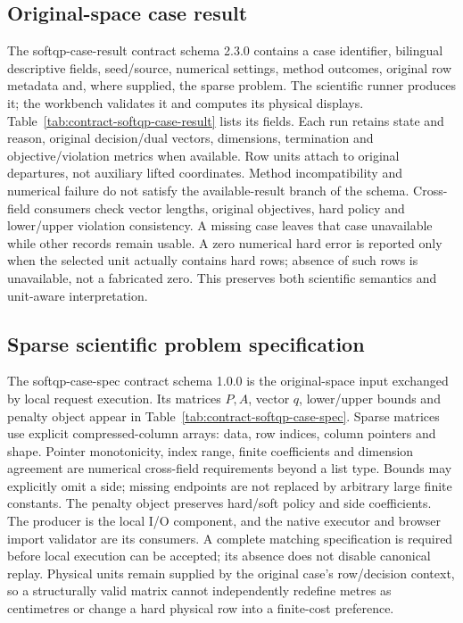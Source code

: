 \subsection{Original-space case result}\label{sec:contract-softqp-case-result}
The softqp-case-result contract schema 2.3.0 contains a case identifier, bilingual
descriptive fields, seed/source, numerical settings, method outcomes, original
row metadata and, where supplied, the sparse problem. The scientific runner
produces it; the workbench validates it and computes its physical displays.
Table~\ref{tab:contract-softqp-case-result} lists its fields. Each run retains
state and reason, original decision/dual vectors, dimensions, termination and
objective/violation metrics when available. Row units attach to original
departures, not auxiliary lifted coordinates. Method incompatibility and
numerical failure do not satisfy the available-result branch of the schema.
Cross-field consumers check vector lengths, original objectives, hard policy
and lower/upper violation consistency. A missing case leaves that case
unavailable while other records remain usable. A zero numerical hard error is
reported only when the selected unit actually contains hard rows; absence of
such rows is unavailable, not a fabricated zero. This preserves both scientific
semantics and unit-aware interpretation.


\subsection{Sparse scientific problem specification}\label{sec:contract-softqp-case-spec}
The softqp-case-spec contract schema 1.0.0 is the original-space input exchanged
by local request execution. Its matrices $P,A$, vector $q$, lower/upper bounds
and penalty object appear in Table~\ref{tab:contract-softqp-case-spec}. Sparse
matrices use explicit compressed-column arrays: data, row indices, column
pointers and shape. Pointer monotonicity, index range, finite coefficients and
dimension agreement are numerical cross-field requirements beyond a list type.
Bounds may explicitly omit a side; missing endpoints are not replaced by
arbitrary large finite constants. The penalty object preserves hard/soft
policy and side coefficients. The producer is the local I/O component, and
the native executor and browser import validator are its consumers. A complete
matching specification is required before local execution can be accepted;
its absence does not disable canonical replay. Physical units remain supplied
by the original case's row/decision context, so a structurally valid matrix
cannot independently redefine metres as centimetres or change a hard physical
row into a finite-cost preference.


